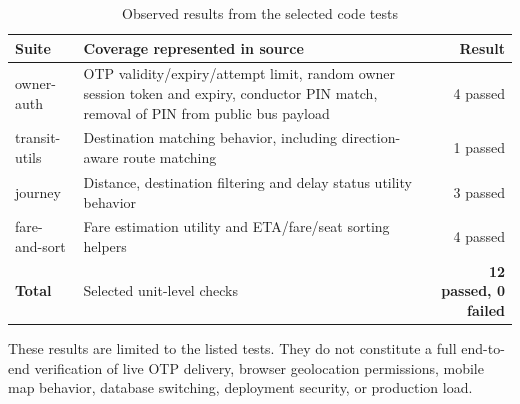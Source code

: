 \documentclass[12pt,a4paper]{report}
\begin{document}
\begin{table}[H]\centering\small\caption{Observed results from the selected code tests}\label{tab:testresults}
\begin{tabularx}{\textwidth}{p{}X r}\toprule\textbf{Suite}&\textbf{Coverage represented in source}&\textbf{Result}\\\midrule
owner-auth&OTP validity/expiry/attempt limit, random owner session token and expiry, conductor PIN match, removal of PIN from public bus payload&4 passed\\
transit-utils&Destination matching behavior, including direction-aware route matching&1 passed\\
journey&Distance, destination filtering and delay status utility behavior&3 passed\\
fare-and-sort&Fare estimation utility and ETA/fare/seat sorting helpers&4 passed\\
\midrule\textbf{Total}&Selected unit-level checks&\textbf{12 passed, 0 failed}\\\bottomrule\end{tabularx}\end{table}

These results are limited to the listed tests. They do not constitute a full end-to-end verification of live OTP delivery, browser geolocation permissions, mobile map behavior, database switching, deployment security, or production load.
\end{document}
